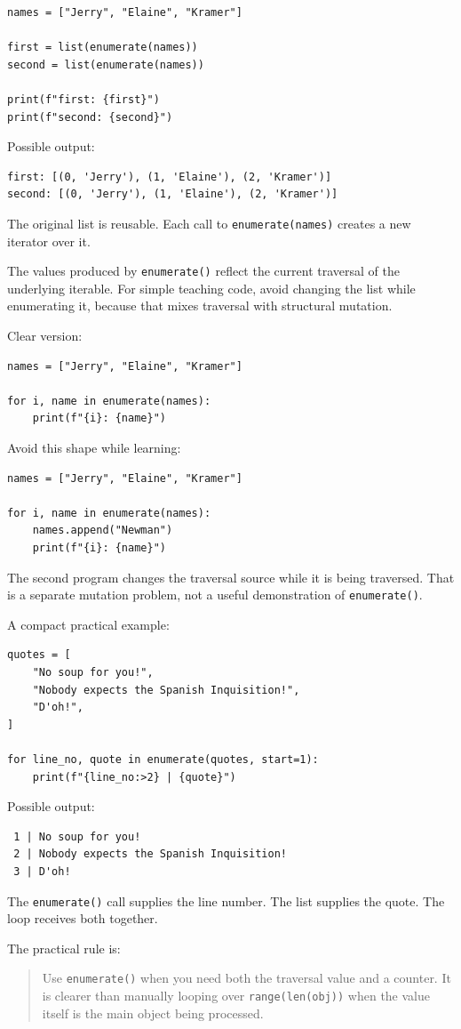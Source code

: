 \begin{verbatim}
names = ["Jerry", "Elaine", "Kramer"]

first = list(enumerate(names))
second = list(enumerate(names))

print(f"first: {first}")
print(f"second: {second}")
\end{verbatim}

Possible output:

\begin{verbatim}
first: [(0, 'Jerry'), (1, 'Elaine'), (2, 'Kramer')]
second: [(0, 'Jerry'), (1, 'Elaine'), (2, 'Kramer')]
\end{verbatim}

The original list is reusable. Each call to \texttt{enumerate(names)} creates a new iterator over it.

The values produced by \texttt{enumerate()} reflect the current traversal of the underlying iterable. For simple teaching code, avoid changing the list while enumerating it, because that mixes traversal with structural mutation.

Clear version:

\begin{verbatim}
names = ["Jerry", "Elaine", "Kramer"]

for i, name in enumerate(names):
    print(f"{i}: {name}")
\end{verbatim}

Avoid this shape while learning:

\begin{verbatim}
names = ["Jerry", "Elaine", "Kramer"]

for i, name in enumerate(names):
    names.append("Newman")
    print(f"{i}: {name}")
\end{verbatim}

The second program changes the traversal source while it is being traversed. That is a separate mutation problem, not a useful demonstration of \texttt{enumerate()}.

A compact practical example:

\begin{verbatim}
quotes = [
    "No soup for you!",
    "Nobody expects the Spanish Inquisition!",
    "D'oh!",
]

for line_no, quote in enumerate(quotes, start=1):
    print(f"{line_no:>2} | {quote}")
\end{verbatim}

Possible output:

\begin{verbatim}
 1 | No soup for you!
 2 | Nobody expects the Spanish Inquisition!
 3 | D'oh!
\end{verbatim}

The \texttt{enumerate()} call supplies the line number. The list supplies the quote. The loop receives both together.

The practical rule is:

\begin{quote}
Use \texttt{enumerate()} when you need both the traversal value and a counter. It is clearer than manually looping over \texttt{range(len(obj))} when the value itself is the main object being processed.
\end{quote}